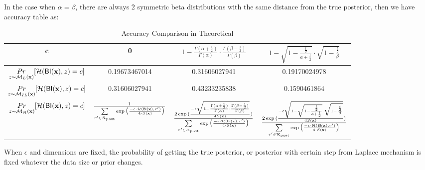 \documentclass{article}
\begin{document}
In the case when $\alpha = \beta$, there are always 2 symmetric beta distributions with the same distance from the true posterior, then we have accuracy table as:
\begin{table}[h!]
\scriptsize
\centering
\begin{tabular}{ |c|c|c|c| } 
\hline
 c & 0 
 & $1 - \frac{\Gamma(\alpha+\frac{1}{2})}{\Gamma(\alpha)} \cdot
  \frac{\Gamma(\beta - \frac{1}{2})}{\Gamma(\beta)}$
  & $1 - 
    \sqrt{1 - \frac{\frac{t}{2}}{a + \frac{t}{2}}}
    \cdot
    \sqrt{1 - \frac{\frac{t}{2}}{\beta}}$  \\
 \hline
 $\underset{z \thicksim \mathcal{M}_L(\textbf{x})}{Pr}[\mathcal{H}(\mathsf{BI}(\textbf{x}), z ) = c] $
 & 0.19673467014 & 0.31606027941 & 0.19170024978 \\
 \hline
 $\underset{z \thicksim \mathcal{M}_{IL}(\textbf{x})}{Pr}[\mathcal{H}(\mathsf{BI}(\textbf{x}), z) = c]$
 & 0.31606027941 & 0.43233235838 & 0.1590461864 \\
 \hline
 $\underset{z \thicksim \mathcal{M}_{\mathcal{H}}(\textbf{x})}{Pr}[\mathcal{H}(\mathsf{BI}(\textbf{x}), z) = c]$
 & $\frac{1}{\sum\limits_{r'\in \mathcal{R}_{\textup{post}}} \exp \big(\frac{-\epsilon\cdot \mathcal{H} (\mathsf{BI}(\textbf{x}),r')}{4 \cdot S(\textbf{x})}\big)}$ 
 & $\frac{2 \exp{(\frac{- \epsilon \sqrt{1 - \frac{\Gamma(\alpha+\frac{1}{2})}{\Gamma(\alpha)} 
 \cdot
 \frac{\Gamma(\beta - \frac{1}{2})}{\Gamma(\beta)}}}{4 S(\textbf{x})})}}{\sum\limits_{r'\in \mathcal{R}_{\textup{post}}} \exp \big(\frac{-\epsilon\cdot \mathcal{H} (\mathsf{BI}(\textbf{x}),r')}{4 \cdot S(\textbf{x})}\big)}$ 
 & $\frac{2 \exp{(\frac{- \epsilon \sqrt{1 - 
    \sqrt{1 - \frac{\frac{t}{2}}{a + \frac{t}{2}}}
    \cdot
    \sqrt{1 - \frac{\frac{t}{2}}{\beta}}}}
    {4 S(\textbf{x})})}}{\sum\limits_{r'\in \mathcal{R}_{\textup{post}}} \exp \big(\frac{-\epsilon\cdot \mathcal{H} (\mathsf{BI}(\textbf{x}),r')}{4 \cdot S(\textbf{x})}\big)}$\\
 \hline
\end{tabular}
\caption{Accuracy Comparison in Theoretical}
\label{tab_acc_theo}
\end{table}

When $\epsilon$ and dimensions are fixed, the probability of getting the true posterior, or posterior with certain step from Laplace mechanism is fixed whatever the data size or prior changes.
\end{document}
